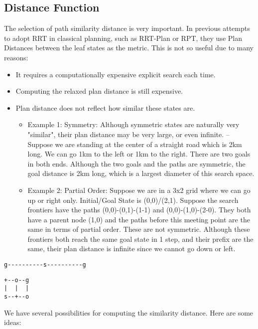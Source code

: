 \subsection{Distance Function}
\label{sec-2-1}

The selection of path similarity distance is very important.
In previous attempts to adopt RRT in classical planning, such as
RRT-Plan or RPT, they use Plan Distances between the leaf states as the
metric. This is not so useful due to many reasons:

\begin{itemize}
\item It requires a computationally expensive explicit search each time.
\item Computing the relaxed plan distance is still expensive.
\item Plan distance does not reflect how similar these states are.
\begin{itemize}
\item Example 1: Symmetry: Although symmetric states are naturally very
"similar", their plan distance may be very large, or even
infinite. -- Suppose we are standing at the center of a straight
road which is 2km long. We can go 1km to the left or 1km to the
right. There are two goals in both ends. Although the two goals and the
paths are symmetric, the goal distance is 2km long, which is a largest
diameter of this search space.
\item Example 2: Partial Order: Suppose we are in a 3x2 grid where we can go
up or right only. Initial/Goal State is (0,0)/(2,1). Suppose the search
frontiers have the paths (0,0)-(0,1)-(1-1) and (0,0)-(1,0)-(2-0).
They both have a parent node
(1,0) and the paths before this meeting point are the same in terms of
partial order. These are not symmetric. Although these frontiers both reach
the same goal state in 1 step, and their prefix are the same, their
plan distance is infinite since we cannot go down or left.
\end{itemize}
\end{itemize}

\begin{verbatim}
g----------s----------g
\end{verbatim}

\begin{verbatim}
+--o--g
|  |  |
s--+--o
\end{verbatim}

We have several possibilities for computing the similarity distance. Here
are some ideas:

